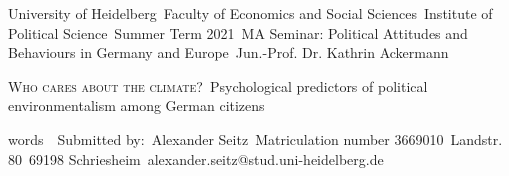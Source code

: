 \thispagestyle{empty}
\noindent
University of Heidelberg\
Faculty of Economics and Social Sciences\
Institute of Political Science\
Summer Term 2021\
MA Seminar: Political Attitudes and Behaviours in Germany and Europe\
Jun.-Prof. Dr. Kathrin Ackermann\
\begin{center}
\vspace*{6cm}
\huge\textsc{Who cares about the climate?}\
\LARGE{Psychological predictors of political environmentalism among German citizens}\
\vspace*{6.5cm}
\end{center}
\noindent
5770 words\
\
Submitted by:\
Alexander Seitz\
Matriculation number 3669010\
Landstr. 80\
69198 Schriesheim\
alexander.seitz@stud.uni-heidelberg.de\
